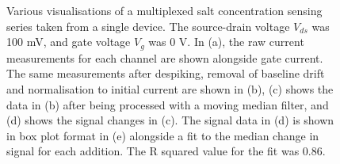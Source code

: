\documentclass[
  a4paper,
]{scrbook}
\begin{document}
\begin{figure}
\begin{minipage}[t]{0.50\linewidth}
{{}

}

\subcaption{\label{fig-salt-conc-signal}}
\end{minipage}%
\newline
\begin{minipage}[t]{0.25\linewidth}

{\centering 

~

}

\end{minipage}%
%
\begin{minipage}[t]{0.50\linewidth}

{\centering 


}

\subcaption{\label{fig-salt-conc-box-plot}}
\end{minipage}%
%
\begin{minipage}[t]{0.25\linewidth}

{\centering 

~

}

\end{minipage}%

\caption{\label{fig-salt-conc-sensing}Various visualisations of a
multiplexed salt concentration sensing series taken from a single
device. The source-drain voltage \(V_{ds}\) was 100 mV, and gate voltage
\(V_g\) was 0 V. In (a), the raw current measurements for each channel
are shown alongside gate current. The same measurements after despiking,
removal of baseline drift and normalisation to initial current are shown
in (b), (c) shows the data in (b) after being processed with a moving
median filter, and (d) shows the signal changes in (c). The signal data
in (d) is shown in box plot format in (e) alongside a fit to the median
change in signal for each addition. The R squared value for the fit was
0.86.}

\end{figure}
\end{document}
